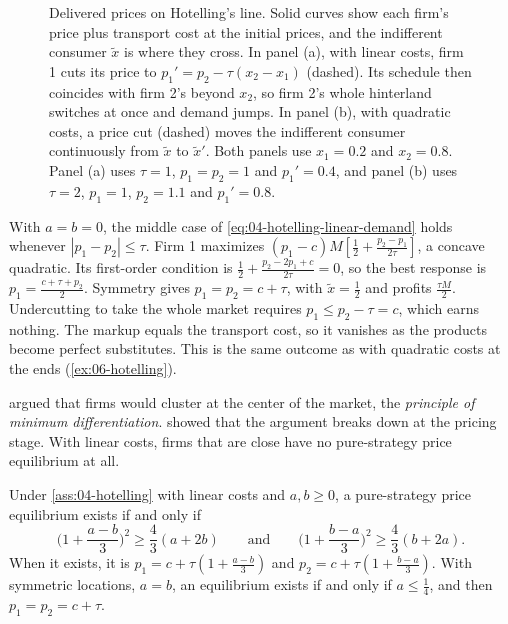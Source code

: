 \begin{figure}[htbp]
\caption{Delivered prices on Hotelling's line. Solid curves show each firm's price plus transport cost at the
initial prices, and the indifferent consumer $\tilde x$ is where they cross. In panel (a), with linear costs, firm 1
cuts its price to $p_1' = p_2 - \tau(x_2 - x_1)$ (dashed). Its schedule then coincides with firm 2's beyond $x_2$,
so firm 2's whole hinterland switches at once and demand jumps. In panel (b), with quadratic costs, a price cut (dashed)
moves the indifferent consumer continuously from $\tilde x$ to $\tilde x'$. Both panels use $x_1 = 0.2$ and $x_2 = 0.8$.
Panel (a) uses $\tau = 1$, $p_1 = p_2 = 1$ and $p_1' = 0.4$, and panel (b) uses $\tau = 2$, $p_1 = 1$, $p_2 = 1.1$ and
$p_1' = 0.8$.}
\label{fig:04-hotelling}
\end{figure}

 With $a = b = 0$, the middle case of \eqref{eq:04-hotelling-linear-demand} holds whenever
$|p_1 - p_2| \le \tau$. Firm 1 maximizes $(p_1 - c)M[\frac{1}{2} + \frac{p_2 - p_1}{2\tau}]$, a concave quadratic. Its
first-order condition is $\frac{1}{2} + \frac{p_2 - 2p_1 + c}{2\tau} = 0$, so the best response is
$p_1 = \frac{c + \tau + p_2}{2}$. Symmetry gives $p_1 = p_2 = c + \tau$, with $\tilde x = \frac{1}{2}$ and profits
$\frac{\tau M}{2}$. Undercutting to take the whole market requires $p_1 \le p_2 - \tau = c$, which earns nothing. The
markup equals the transport cost, so it vanishes as the products become perfect substitutes. This is the same
outcome as with quadratic costs at the ends (\cref{ex:06-hotelling}).

  argued that firms would cluster at the center
of the market, the \emph{principle of minimum differentiation}.  showed that
the argument breaks down at the pricing stage. With linear costs, firms that are close have no pure-strategy price
equilibrium at all.

\begin{proposition}\label{prop:04-dgt}
Under \cref{ass:04-hotelling} with linear costs and $a, b \ge 0$, a pure-strategy price equilibrium exists if and only if
\begin{equation}\label{eq:04-dgt}
\Big(1 + \frac{a - b}{3}\Big)^2 \ge \frac{4}{3}(a + 2b)
\qquad\text{and}\qquad
\Big(1 + \frac{b - a}{3}\Big)^2 \ge \frac{4}{3}(b + 2a).
\end{equation}
When it exists, it is $p_1 = c + \tau(1 + \frac{a - b}{3})$ and $p_2 = c + \tau(1 + \frac{b - a}{3})$. With symmetric
locations, $a = b$, an equilibrium exists if and only if $a \le \frac{1}{4}$, and then $p_1 = p_2 = c + \tau$.
\end{proposition}

